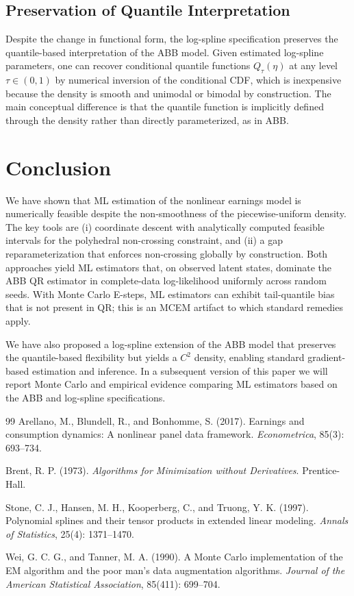 \documentclass[12pt]{article}
\begin{document}
\subsection{Preservation of Quantile Interpretation}

Despite the change in functional form, the log-spline specification preserves the quantile-based interpretation of the ABB model. Given estimated log-spline parameters, one can recover conditional quantile functions $Q_{\tau}(\eta)$ at any level $\tau \in (0, 1)$ by numerical inversion of the conditional CDF, which is inexpensive because the density is smooth and unimodal or bimodal by construction. The main conceptual difference is that the quantile function is implicitly defined through the density rather than directly parameterized, as in ABB.

\section{Conclusion}

We have shown that ML estimation of the \citet{abb2017} nonlinear earnings model is numerically feasible despite the non-smoothness of the piecewise-uniform density. The key tools are (i) coordinate descent with analytically computed feasible intervals for the polyhedral non-crossing constraint, and (ii) a gap reparameterization that enforces non-crossing globally by construction. Both approaches yield ML estimators that, on observed latent states, dominate the ABB QR estimator in complete-data log-likelihood uniformly across random seeds. With Monte Carlo E-steps, ML estimators can exhibit tail-quantile bias that is not present in QR; this is an MCEM artifact to which standard remedies apply.

We have also proposed a log-spline extension of the ABB model that preserves the quantile-based flexibility but yields a $C^{2}$ density, enabling standard gradient-based estimation and inference. In a subsequent version of this paper we will report Monte Carlo and empirical evidence comparing ML estimators based on the ABB and log-spline specifications.


\begin{thebibliography}{99}
Arellano, M., Blundell, R., and Bonhomme, S. (2017).
Earnings and consumption dynamics: A nonlinear panel data framework.
\textit{Econometrica}, 85(3): 693--734.

Brent, R. P. (1973).
\textit{Algorithms for Minimization without Derivatives}.
Prentice-Hall.

Stone, C. J., Hansen, M. H., Kooperberg, C., and Truong, Y. K. (1997).
Polynomial splines and their tensor products in extended linear modeling.
\textit{Annals of Statistics}, 25(4): 1371--1470.

Wei, G. C. G., and Tanner, M. A. (1990).
A Monte Carlo implementation of the EM algorithm and the poor man's data augmentation algorithms.
\textit{Journal of the American Statistical Association}, 85(411): 699--704.
\end{thebibliography}
\end{document}
